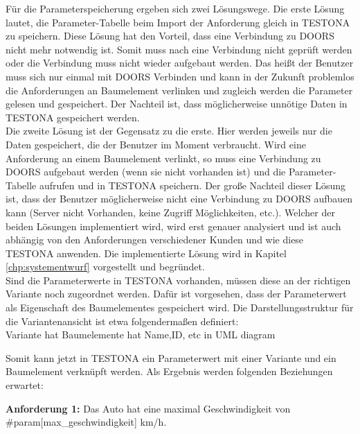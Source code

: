 Für die Parameterspeicherung ergeben sich zwei Lösungswege. Die erste Lösung lautet, die Parameter-Tabelle beim Import der Anforderung gleich in TESTONA zu speichern. Diese Lösung hat den Vorteil, dass eine Verbindung zu DOORS nicht mehr notwendig ist. Somit muss nach eine Verbindung nicht geprüft werden oder die Verbindung muss nicht wieder aufgebaut werden. Das heißt der Benutzer muss sich nur einmal mit DOORS Verbinden und kann in der Zukunft problemlos die Anforderungen an Baumelement verlinken und zugleich werden die Parameter gelesen und gespeichert. Der Nachteil ist, dass möglicherweise unnötige Daten in TESTONA gespeichert werden.\\

Die zweite Lösung ist der Gegensatz zu die erste. Hier werden jeweils nur die Daten gespeichert, die der Benutzer im Moment verbraucht. Wird eine Anforderung an einem Baumelement verlinkt, so muss eine Verbindung zu DOORS aufgebaut werden (wenn sie nicht vorhanden ist) und die Parameter-Tabelle aufrufen und in TESTONA speichern. Der große Nachteil dieser Lösung ist, dass der Benutzer möglicherweise nicht eine Verbindung zu DOORS aufbauen kann (Server nicht Vorhanden, keine Zugriff Möglichkeiten, etc.). Welcher der beiden Lösungen implementiert wird, wird erst genauer analysiert und ist auch abhängig von den Anforderungen verschiedener Kunden und wie diese TESTONA anwenden. Die implementierte Lösung wird in Kapitel \ref{chp:systementwurf} vorgestellt und begründet.\\


Sind die Parameterwerte in TESTONA vorhanden, müssen diese an der richtigen Variante noch zugeordnet werden. Dafür ist vorgesehen, dass der Parameterwert als Eigenschaft des Baumelementes gespeichert wird. Die Darstellungsstruktur für die Variantenansicht ist etwa folgendermaßen definiert:\\

Variante hat Baumelemente hat Name,ID, etc in UML diagram





Somit kann jetzt in TESTONA ein Parameterwert mit einer Variante und ein Baumelement verknüpft werden. Als Ergebnis werden folgenden Beziehungen erwartet:

\begin{center}
\textbf{Anforderung 1: }Das Auto hat eine maximal Geschwindigkeit von \#param[max\_geschwindigkeit] km/h.
\end{center}

